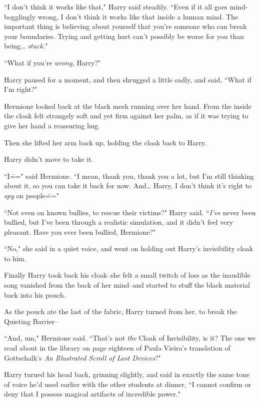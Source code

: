 ``I don't think it works like that," Harry said steadily. ``Even if it all goes mind-bogglingly wrong, I don't think it works like that inside a human mind. The important thing is believing about yourself that you're someone who can break your boundaries. Trying and getting hurt can't possibly be worse for you than being{\ldots} \emph{stuck.}"

``What if you're \emph{wrong}, Harry?"

Harry paused for a moment, and then shrugged a little sadly, and said, ``What if I'm right?"

Hermione looked back at the black mesh running over her hand. From the inside the cloak felt strangely soft and yet firm against her palm, as if it was trying to give her hand a reassuring hug.

Then she lifted her arm back up, holding the cloak back to Harry.

Harry didn't move to take it.

``I\===" said Hermione. ``I mean, thank you, thank you a lot, but I'm still thinking about it, so you can take it back for now. And{\ldots} Harry, I don't think it's right to \emph{spy} on people\==="

``Not even on known bullies, to rescue their victims?" Harry said. ``\emph{I've} never been bullied, but I've been through a realistic simulation, and it didn't feel very pleasant. Have you ever been bullied, Hermione?"

``No," she said in a quiet voice, and went on holding out Harry's invisibility cloak to him.

Finally Harry took back his cloak\---she felt a small twitch of loss as the inaudible song vanished from the back of her mind\---and started to stuff the black material back into his pouch.

As the pouch ate the last of the fabric, Harry turned from her, to break the Quieting Barrier\---

``And, um," Hermione said. ``That's not \emph{the} Cloak of Invisibility, is it? The one we read about in the library on page eighteen of Paula Vieira's translation of Gottschalk's \emph{An Illustrated Scroll of Lost Devices}?"

Harry turned his head back, grinning slightly, and said in exactly the same tone of voice he'd used earlier with the other students at dinner, ``I cannot confirm or deny that I possess magical artifacts of incredible power."

\later


